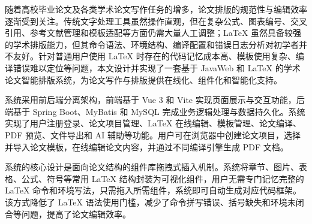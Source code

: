 随着高校毕业论文及各类学术论文写作任务的增多，论文排版的规范性与编辑效率逐渐受到关注。传统文字处理工具虽然操作直观，但在复杂公式、图表编号、交叉引用、参考文献管理和模板适配等方面仍需大量人工调整；LaTeX 虽然具备较强的学术排版能力，但其命令语法、环境结构、编译配置和错误日志分析对初学者并不友好。针对普通用户使用 LaTeX 时存在的代码记忆成本高、模板使用复杂、编译错误难以定位等问题，本文设计并实现了一套基于 JavaWeb 和 LaTeX 的学术论文智能排版系统，为论文写作与排版提供在线化、组件化和智能化支持。 

系统采用前后端分离架构，前端基于 Vue 3 和 Vite 实现页面展示与交互功能，后端基于 Spring Boot、MyBatis 和 MySQL 完成业务逻辑处理与数据持久化。系统实现了用户注册登录、论文项目管理、LaTeX 在线编辑、模板管理、论文编译、PDF 预览、文件导出和 AI 辅助等功能。用户可在浏览器中创建论文项目，选择并导入论文模板，在线编辑论文内容，并通过不同编译引擎生成 PDF 文档。 

系统的核心设计是面向论文结构的组件库拖拽式插入机制。系统将章节、图片、表格、公式、符号等常用 LaTeX 结构封装为可视化组件，用户无需专门记忆完整的 LaTeX 命令和环境写法，只需拖入所需组件，系统即可自动生成对应代码框架。该方式降低了 LaTeX 语法使用门槛，减少了命令拼写错误、括号缺失和环境未闭合等问题，提高了论文编辑效率。 